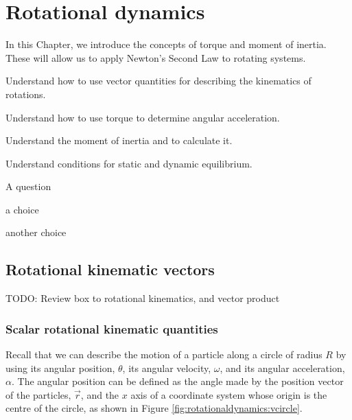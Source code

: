 
\chapter{Rotational dynamics}
\label{chapter:rotationaldynamics}
In this Chapter, we introduce the concepts of torque and moment of inertia. These will allow us to apply Newton's Second Law to rotating systems. 

\begin{learningObjectives}{
 \item Understand how to use vector quantities for describing the kinematics of rotations.
 \item Understand how to use torque to determine angular acceleration.
 \item Understand the moment of inertia and to calculate it.
 \item Understand conditions for static and dynamic equilibrium.
 }
\end{learningObjectives}

\begin{opening}
\begin{MCquestion}{A question}
\item a choice
\item another choice %
\end{MCquestion}
\end{opening}

\section{Rotational kinematic vectors}
TODO: Review box to rotational kinematics, and vector product

\subsection{Scalar rotational kinematic quantities}
Recall that we can describe the motion of a particle along a circle of radius $R$ by using its angular position, $\theta$, its angular velocity, $\omega$, and its angular acceleration, $\alpha$. The angular position can be defined as the angle made by the position vector of the particles, $\vec r$, and the $x$ axis of a coordinate system whose origin is the centre of the circle, as shown in Figure \ref{fig:rotationaldynamics:vcircle}. 

